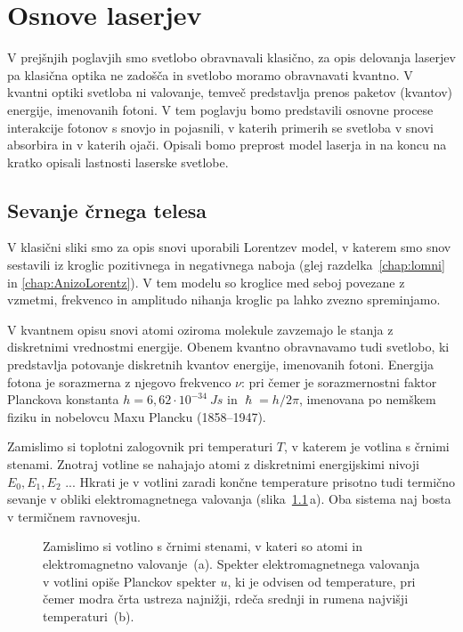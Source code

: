 
\chapter{Osnove laserjev}
V prejšnjih poglavjih smo svetlobo obravnavali klasično, za
opis delovanja laserjev pa klasična optika ne zadošča in 
svetlobo moramo obravnavati kvantno. V kvantni optiki svetloba ni valovanje, 
temveč predstavlja prenos paketov (kvantov) energije, imenovanih fotoni. 
V tem poglavju bomo predstavili osnovne procese interakcije 
fotonov s snovjo in  pojasnili, v katerih primerih se svetloba v snovi
absorbira in v katerih ojači. Opisali bomo preprost model laserja 
in na koncu na kratko opisali lastnosti laserske svetlobe.

\section{Sevanje črnega telesa}
V klasični sliki smo za opis snovi uporabili Lorentzev model, 
v katerem smo snov sestavili iz kroglic pozitivnega in 
negativnega naboja (glej razdelka~\ref{chap:lomni} in \ref{chap:AnizoLorentz}).
V tem modelu so kroglice med seboj povezane z vzmetmi, frekvenco
in amplitudo nihanja kroglic pa lahko zvezno spreminjamo.

V kvantnem opisu snovi atomi oziroma molekule zavzemajo
le stanja z diskretnimi vrednostmi energije. Obenem kvantno
obravnavamo tudi svetlobo, ki predstavlja potovanje diskretnih
kvantov energije, imenovanih fotoni. 
Energija fotona je sorazmerna z njegovo frekvenco $\nu$:
pri čemer je sorazmernostni faktor Planckova konstanta
$h = 6,62 \cdot 10^{-34}~\si{Js}$ in $\hslash = h/2\pi$, imenovana 
po nemškem fiziku in nobelovcu Maxu Plancku (1858--1947).

Zamislimo si toplotni zalogovnik pri temperaturi $T$, v katerem 
je votlina s črnimi stenami. Znotraj votline se nahajajo atomi z diskretnimi
energijskimi nivoji $E_0, E_1, E_2$ ... Hkrati je v votlini zaradi 
končne temperature prisotno tudi termično sevanje v obliki 
elektromagnetnega valovanja (slika~\ref{fig:11_votlina}\,a). 
Oba sistema naj bosta v termičnem ravnovesju.
\begin{figure}[h!]
\centering
\def\svgwidth{130truemm} 

\caption{Zamislimo si votlino s črnimi stenami, v kateri so 
atomi in elektromagnetno valovanje~(a). Spekter elektromagnetnega 
valovanja v votlini opiše Planckov spekter $u$, ki 
je odvisen od temperature, pri čemer modra črta ustreza 
najnižji, rdeča srednji in rumena najvišji temperaturi~(b). 
}
\label{fig:11_votlina}
\end{figure}

